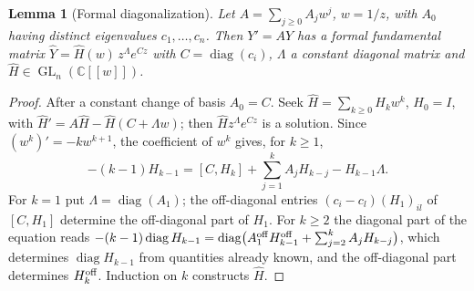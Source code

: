 \documentclass[11pt]{article}
\numberwithin{equation}{section}
\newtheorem{lemma}[lemma]{Lemma}
\theoremstyle{definition}
\theoremstyle{remark}
\newcommand{\C}{\mathbb C}
\newcommand{\GL}{\operatorname{GL}}
\begin{document}
\begin{lemma}[Formal diagonalization]\label{lem:formal}
Let $A=\sum_{j\ge0}A_jw^j$, $w=1/z$, with $A_0$ having distinct eigenvalues
$c_1,\dots,c_n$. Then $Y'=AY$ has a formal fundamental matrix
$\widehat Y=\widehat H(w)\,z^{\Lambda}e^{Cz}$ with $C=\operatorname{diag}(c_i)$,
$\Lambda$ a constant diagonal matrix and $\widehat H\in\GL_n(\C[[w]])$.
\end{lemma}
\begin{proof}
After a constant change of basis $A_0=C$. Seek $\widehat H=\sum_{k\ge0}H_kw^k$,
$H_0=I$, with $\widehat H'=A\widehat H-\widehat H(C+\Lambda w)$; then
$\widehat Hz^\Lambda e^{Cz}$ is a solution. Since $(w^k)'=-kw^{k+1}$, the
coefficient of $w^k$ gives, for $k\ge1$,
\[
 -(k-1)H_{k-1}=[C,H_k]+\sum_{j=1}^kA_jH_{k-j}-H_{k-1}\Lambda .
\]
For $k=1$ put $\Lambda=\operatorname{diag}(A_1)$; the off-diagonal entries
$(c_i-c_l)(H_1)_{il}$ of $[C,H_1]$ determine the off-diagonal part of $H_1$.
For $k\ge2$ the diagonal part of the equation reads
$-(k-1)\operatorname{diag}H_{k-1}=\operatorname{diag}\bigl(A_1^{\rm off}H_{k-1}^{\rm off}
+\sum_{j=2}^kA_jH_{k-j}\bigr)$, which determines $\operatorname{diag}H_{k-1}$ from
quantities already known, and the off-diagonal part determines
$H_k^{\rm off}$. Induction on $k$ constructs $\widehat H$.
\end{proof}
\end{document}
